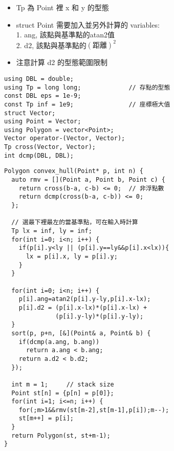 \begin{itemize}
    \item Tp 為 Point 裡 x 和 y 的型態
    \item struct Point 需要加入並另外計算的 variables: \\
        1. ang, 該點與基準點的atan2值 \\
        2. d2, 該點與基準點的$(距離)^2$
    \item 注意計算 d2 的型態範圍限制
\end{itemize}

\begin{center}
\begin{lstlisting}
using DBL = double;
using Tp = long long;             // 存點的型態
const DBL eps = 1e-9;
const Tp inf = 1e9;               // 座標極大值
struct Vector;
using Point = Vector;
using Polygon = vector<Point>;
Vector operator-(Vector, Vector);
Tp cross(Vector, Vector);
int dcmp(DBL, DBL);
\end{lstlisting}
\begin{lstlisting}
Polygon convex_hull(Point* p, int n) {
  auto rmv = [](Point a, Point b, Point c) {
    return cross(b-a, c-b) <= 0;  // 非浮點數
    return dcmp(cross(b-a, c-b)) <= 0;
  };

  // 選最下裡最左的當基準點，可在輸入時計算
  Tp lx = inf, ly = inf;
  for(int i=0; i<n; i++) {
    if(p[i].y<ly || (p[i].y==ly&&p[i].x<lx)){
      lx = p[i].x, ly = p[i].y;
    } 
  }

  for(int i=0; i<n; i++) {
    p[i].ang=atan2(p[i].y-ly,p[i].x-lx);
    p[i].d2 = (p[i].x-lx)*(p[i].x-lx) +
              (p[i].y-ly)*(p[i].y-ly);
  }
  sort(p, p+n, [&](Point& a, Point& b) {
    if(dcmp(a.ang, b.ang))
      return a.ang < b.ang;
    return a.d2 < b.d2;
  });

  int m = 1;     // stack size
  Point st[n] = {p[n] = p[0]};
  for(int i=1; i<=n; i++) {
    for(;m>1&&rmv(st[m-2],st[m-1],p[i]);m--);
    st[m++] = p[i];
  }
  return Polygon(st, st+m-1);
}
\end{lstlisting}
\end{center}